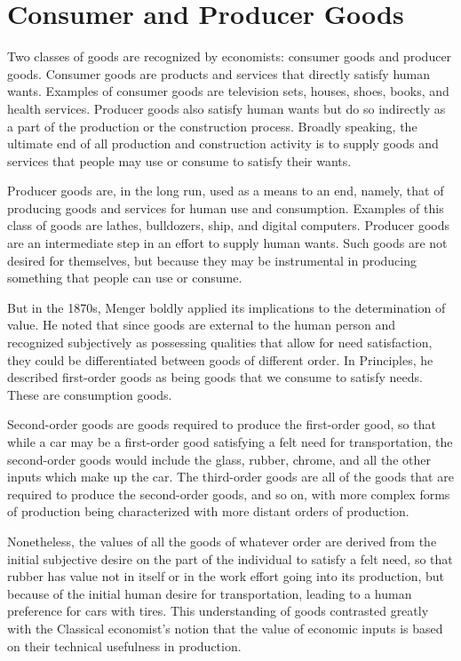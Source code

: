 
\section{Consumer and Producer Goods}

Two classes of goods are recognized by economists: consumer goods and producer goods. Consumer goods are products and services that directly satisfy human wants. Examples of consumer goods are television sets, houses, shoes, books, and health services. Producer goods also satisfy human wants but do so indirectly as a part of the production or the construction process. Broadly speaking, the ultimate end of all production and construction activity is to supply goods and services that people may use or consume to satisfy their wants.

Producer goods are, in the long run, used as a means to an end, namely, that of producing goods and services for human use and consumption. Examples of this class of goods are lathes, bulldozers, ship, and digital computers. Producer goods are an intermediate step in an effort to supply human wants. Such goods are not desired for themselves, but because they may be instrumental in producing something that people can use or consume.

But in the 1870s, Menger boldly applied its implications to the determination of value. He noted that since goods are external to the human person and recognized subjectively as possessing qualities that allow for need satisfaction, they could be differentiated between goods of different order. In Principles, he described first-order goods as being goods that we consume to satisfy needs. These are consumption goods.

Second-order goods are goods required to produce the first-order good, so that while a car may be a first-order good satisfying a felt need for transportation, the second-order goods would include the glass, rubber, chrome, and all the other inputs which make up the car. The third-order goods are all of the goods that are required to produce the second-order goods, and so on, with more complex forms of production being characterized with more distant orders of production.

Nonetheless, the values of all the goods of whatever order are derived from the initial subjective desire on the part of the individual to satisfy a felt need, so that rubber has value not in itself or in the work effort going into its production, but because of the initial human desire for transportation, leading to a human preference for cars with tires. This understanding of goods contrasted greatly with the Classical economist’s notion that the value of economic inputs is based on their technical usefulness in production.
    
